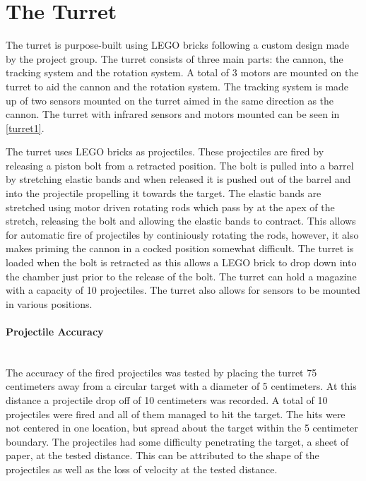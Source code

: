 \section{The Turret}\label{turret}
The turret is purpose-built using LEGO bricks following a custom design made by the project group. The turret consists of three main parts: the cannon, the tracking system and the rotation system. A total of 3 motors are mounted on the turret to aid the cannon and the rotation system. The tracking system is made up of two sensors mounted on the turret aimed in the same direction as the cannon. The turret with infrared sensors and motors mounted can be seen in \cref{turret1}. \\


The turret uses LEGO bricks as projectiles. These projectiles are fired by releasing a piston bolt from a retracted position. The bolt is pulled into a barrel by stretching elastic bands and when released it is pushed out of the barrel and into the projectile propelling it towards the target. The elastic bands are stretched using motor driven rotating rods which pass by at the apex of the stretch, releasing the bolt and allowing the elastic bands to contract. This allows for automatic fire of projectiles by continiously rotating the rods, however, it also makes priming the cannon in a cocked position somewhat difficult. The turret is loaded when the bolt is retracted as this allows a LEGO brick to drop down into the chamber just prior to the release of the bolt. The turret can hold a magazine with a capacity of 10 projectiles. The turret also allows for sensors to be mounted in various positions.

\paragraph{Projectile Accuracy} ~\\
The accuracy of the fired projectiles was tested by placing the turret 75 centimeters away from a circular target with a diameter of 5 centimeters. At this distance a projectile drop off of 10 centimeters was recorded. A total of 10 projectiles were fired and all of them managed to hit the target. The hits were not centered in one location, but spread about the target within the 5 centimeter boundary. The projectiles had some difficulty penetrating the target, a sheet of paper, at the tested distance. This can be attributed to the shape of the projectiles as well as the loss of velocity at the tested distance.

